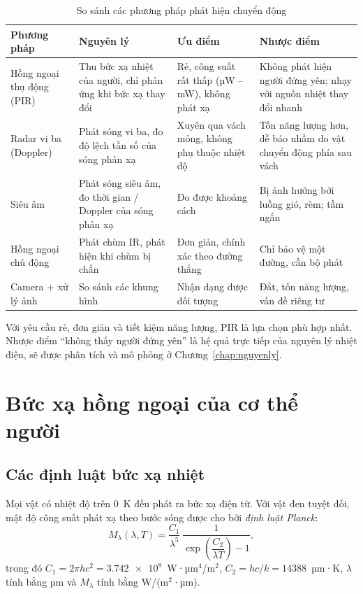 \begin{table}[!htb]
\centering
\caption{So sánh các phương pháp phát hiện chuyển động}
\label{tab:sosanh}
\small
\begin{tabularx}{\textwidth}{@{}p{2.6cm}LLL@{}}
\toprule
\textbf{Phương pháp} & \textbf{Nguyên lý} & \textbf{Ưu điểm} & \textbf{Nhược điểm} \\ \midrule
Hồng ngoại thụ động (PIR) & Thu bức xạ nhiệt của người, chỉ phản ứng khi bức xạ thay đổi & Rẻ, công suất rất thấp (µW -- mW), không phát xạ & Không phát hiện người đứng yên; nhạy với nguồn nhiệt thay đổi nhanh \\
Radar vi ba (Doppler) & Phát sóng vi ba, đo độ lệch tần số của sóng phản xạ & Xuyên qua vách mỏng, không phụ thuộc nhiệt độ & Tốn năng lượng hơn, dễ báo nhầm do vật chuyển động phía sau vách \\
Siêu âm & Phát sóng siêu âm, đo thời gian / Doppler của sóng phản xạ & Đo được khoảng cách & Bị ảnh hưởng bởi luồng gió, rèm; tầm ngắn \\
Hồng ngoại chủ động & Phát chùm IR, phát hiện khi chùm bị chắn & Đơn giản, chính xác theo đường thẳng & Chỉ bảo vệ một đường, cần bộ phát \\
Camera + xử lý ảnh & So sánh các khung hình & Nhận dạng được đối tượng & Đắt, tốn năng lượng, vấn đề riêng tư \\
\bottomrule
\end{tabularx}
\end{table}

Với yêu cầu rẻ, đơn giản và tiết kiệm năng lượng, PIR là lựa chọn phù hợp nhất. Nhược điểm ``không thấy người đứng yên'' là hệ quả trực tiếp của nguyên lý nhiệt điện, sẽ được phân tích và mô phỏng ở Chương~\ref{chap:nguyenly}.

\section{Bức xạ hồng ngoại của cơ thể người}
\label{sec:bucxa}

\subsection{Các định luật bức xạ nhiệt}

Mọi vật có nhiệt độ trên 0~K đều phát ra bức xạ điện từ. Với vật đen tuyệt đối, mật độ công suất phát xạ theo bước sóng được cho bởi \emph{định luật Planck}:
\begin{equation}
  M_\lambda(\lambda,T) = \frac{C_1}{\lambda^5}\,\frac{1}{\exp\!\left(\dfrac{C_2}{\lambda T}\right)-1},
  \label{eq:planck}
\end{equation}
trong đó $C_1 = 2\pi h c^2 = \num{3.742e8}$~W·µm$^4$/m$^2$, $C_2 = hc/k = \num{14388}$~µm·K, $\lambda$ tính bằng µm và $M_\lambda$ tính bằng W/(m$^2$·µm).

